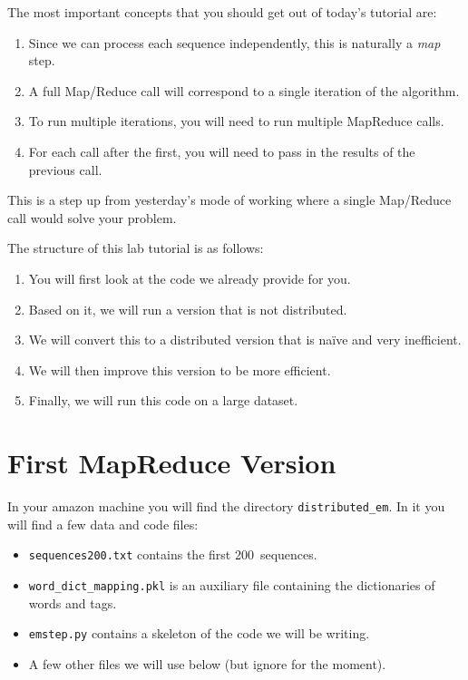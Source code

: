 The most important concepts that you should get out of today's tutorial are:

\begin{enumerate}
\item Since we can process each sequence independently, this is naturally a
\emph{map} step.
\item A full Map/Reduce call will correspond to a single iteration of the
algorithm.
\item To run multiple iterations, you will need to run multiple MapReduce
calls.
\item For each call after the first, you will need to pass in the results of
the previous call.
\end{enumerate}

This is a step up from yesterday's mode of working where a single Map/Reduce
call would solve your problem.

The structure of this lab tutorial is as follows:

\begin{enumerate}
\item You will first look at the code we already provide for you.
\item Based on it, we will run a version that is not distributed.
\item We will convert this to a distributed version that is na\"{i}ve and very inefficient.
\item We will then improve this version to be more efficient.
\item Finally, we will run this code on a large dataset.
\end{enumerate}

\section{First MapReduce Version}

In your amazon machine you will find the directory \texttt{distributed\_em}. In
it you will find a few data and code files:

\begin{itemize}
\item \verb+sequences200.txt+ contains the first 200~sequences.
\item \verb+word_dict_mapping.pkl+ is an auxiliary file containing the dictionaries of words and tags.
\item \verb+emstep.py+ contains a skeleton of the code we will be writing.
\item A few other files we will use below (but ignore for the moment).
\end{itemize}

